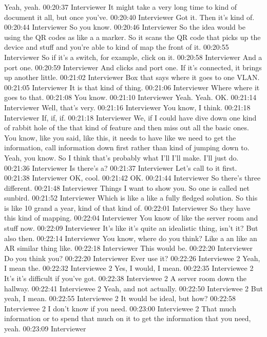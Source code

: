 Yeah, yeah.
00:20:37 Interviewer
It might take a very long time to kind of document it all, but once you've.
00:20:40 Interviewer
Got it. Then it's kind of.
00:20:44 Interviewer
So you know.
00:20:46 Interviewer
So the idea would be using the QR codes as like a a marker. So it scans the QR code that picks up the device and stuff and you're able to kind of map the front of it.
00:20:55 Interviewer
So if it's a switch, for example, click on it.
00:20:58 Interviewer
And a port one.
00:20:59 Interviewer
And clicks and port one. If it's connected, it brings up another little.
00:21:02 Interviewer
Box that says where it goes to one VLAN.
00:21:05 Interviewer
It is that kind of thing.
00:21:06 Interviewer
Where where it goes to that.
00:21:08
You know.
00:21:10 Interviewer
Yeah. Yeah. OK.
00:21:14 Interviewer
Well, that's very.
00:21:16 Interviewer
You know, I think.
00:21:18 Interviewer
If, if, if.
00:21:18 Interviewer
We, if I could have dive down one kind of rabbit hole of the that kind of feature and then miss out all the basic ones. You know, like you said, like this, it needs to have like we need to get the information, call information down first rather than kind of jumping down to. Yeah, you know. So I think that's probably what I'll I'll make. I'll just do.
00:21:36 Interviewer
Is there's a?
00:21:37 Interviewer
Let's call to it first.
00:21:38 Interviewer
OK, cool.
00:21:42
OK.
00:21:44 Interviewer
So there's three different.
00:21:48 Interviewer
Things I want to show you. So one is called net sunbird.
00:21:52 Interviewer
Which is like a like a fully fledged solution. So this is like 10 grand a year, kind of that kind of.
00:22:01 Interviewer
So they have this kind of mapping.
00:22:04 Interviewer
You know of like the server room and stuff now.
00:22:09 Interviewer
It's like it's quite an idealistic thing, isn't it? But also then.
00:22:14 Interviewer
You know, where do you think? Like a an like an AR similar thing like.
00:22:18 Interviewer
This would be.
00:22:20 Interviewer
Do you think you?
00:22:20 Interviewer
Ever use it?
00:22:26 Interviewee 2 
Yeah, I mean the.
00:22:32 Interviewee 2 
Yes, I would, I mean.
00:22:35 Interviewee 2 
It's it's difficult if you've got.
00:22:38 Interviewee 2 
A server room down the hallway.
00:22:41 Interviewee 2 
Yeah, and not actually.
00:22:50 Interviewee 2 
But yeah, I mean.
00:22:55 Interviewee 2 
It would be ideal, but how?
00:22:58 Interviewee 2 
I don't know if you need.
00:23:00 Interviewee 2 
That much information or to spend that much on it to get the information that you need, yeah.
00:23:09 Interviewer
